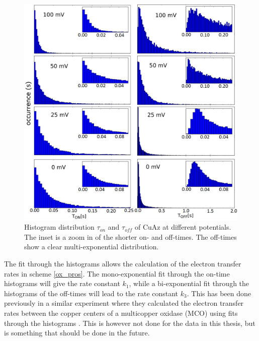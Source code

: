 \documentclass[twoside,single]{lion-msc}
\begin{document}
\begin{figure}[ht!]
\centering
\includegraphics[width=\textwidth]{Figure_4_4_histogram_thesis_test}
\caption{Histogram distribution $\tau_{on}$ and $\tau_{off}$ of CuAz at different potentials. The inset is a zoom in of the shorter on- and off-times. The off-times show a clear multi-exponential distribution.}
\label{histograms_disc}
\end{figure}

The fit through the histograms allows the calculation of the electron transfer rates in scheme \ref{ox_pros}. The mono-exponential fit through the on-time histograms will give the rate constant $k_{1}$, while a bi-exponential fit through the histograms of the off-times will lead to the rate constant $k_{3}$. This has been done previously in a similar experiment where they calculated the electron transfer rates  between the copper centers of a multicopper oxidase (MCO) using fits through the histograms \cite{Gupta2014a}. This is however not done for the data in this thesis, but is something that should be done in the future.
\end{document}
